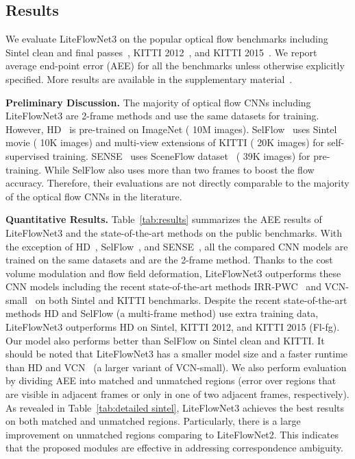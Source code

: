 \documentclass[runningheads]{llncs}
\begin{document}
\subsection{Results}
\label{sec:results}
We evaluate LiteFlowNet3 on the popular optical flow benchmarks including Sintel clean and final passes~\cite{Butler12}, KITTI 2012~\cite{Geiger12}, and KITTI 2015~\cite{Menze15}. We report average end-point error (AEE) for all the benchmarks unless otherwise explicitly specified. More results are available in the supplementary material~\cite{Hui20a}.
 
\noindent\textbf{Preliminary Discussion.} The majority of optical flow CNNs including LiteFlowNet3 are 2-frame methods and use the same datasets for training. However, HD~\cite{Yin19} is pre-trained on ImageNet ( 10M images). SelFlow~\cite{Liu19} uses Sintel movie ( 10K images) and multi-view extensions of KITTI ( 20K images) for self-supervised training. SENSE~\cite{Jiang19} uses SceneFlow dataset~\cite{Mayer16} ( 39K images) for pre-training. While SelFlow also uses more than two frames to boost the flow accuracy. Therefore, their evaluations are not directly comparable to the majority of the optical flow CNNs in the literature.

\noindent\textbf{Quantitative Results.} Table~\ref{tab:results} summarizes the AEE results of LiteFlowNet3 and the state-of-the-art methods on the public benchmarks.
With the exception of HD~\cite{Yin19}, SelFlow~\cite{Liu19}, and SENSE~\cite{Jiang19}, all the compared CNN models are trained on the same datasets and are the 2-frame method. Thanks to the cost volume modulation and flow field deformation, LiteFlowNet3 outperforms these CNN models including the recent state-of-the-art methods IRR-PWC~\cite{Hur19} and VCN-small~\cite{Yang19} on both Sintel and KITTI benchmarks.
Despite the recent state-of-the-art methods HD and SelFlow (a multi-frame method) use extra training data, LiteFlowNet3 outperforms HD on Sintel, KITTI 2012, and KITTI 2015 (Fl-fg). Our model also performs better than SelFlow on Sintel clean and KITTI. It should be noted that LiteFlowNet3 has a smaller model size and a faster runtime than HD and VCN~\cite{Yang19} (a larger variant of VCN-small). 
We also perform evaluation by dividing AEE into matched and unmatched regions (error over regions that are visible in adjacent frames or only in one of two adjacent frames, respectively). As revealed in Table~\ref{tab:detailed sintel}, LiteFlowNet3 achieves the best results on both matched and unmatched regions. Particularly, there is a large improvement on unmatched regions comparing to LiteFlowNet2. This indicates that the proposed modules are effective in addressing correspondence ambiguity.
\end{document}
